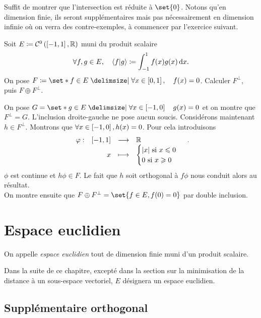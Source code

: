 \documentclass{magnolia}
\begin{document}
\begin{sol}
Suffit de montrer que l'intersection est réduite à $\set{0}$. Notons qu'en dimension finie, ils seront supplémentaires mais pas nécessairement en dimension infinie où on verra des contre-exemples, à commencer par l'exercice suivant.
\end{sol}

\begin{exoUnique}
\exo Soit $E\coloneqq\mathcal{C}^{0}\left(\left[-1,1\right],\mathbb{R}\right)$ muni du produit scalaire
  \[\forall f,g\in E ,\quad \left\langle {f}\middle|{g}\right\rangle\coloneqq\int_{-1}^{1} f(x)g(x)\,\text{d}x.\]
  On pose $F\defeq\enstq{f\in E}{\forall x\in\interf{0}{1} \qsep f(x)=0}$.
  Calculer $F^\perp$, puis $F\oplus F^\perp$.
  \begin{sol}
  On pose $G=\enstq{g\in E}{\forall x\in\interf{-1}{0} \quad g(x)=0}$ et on montre que $F^\perp=G$. L'inclusion droite-gauche ne pose aucun soucis. Considérons maintenant $h\in F^\perp$. Montrons que $\forall x \in \left[-1,0\right], h(x)=0$. Pour cela introduisons $$\begin{array}[t]{lrcl} \displaystyle{\varphi} : & \displaystyle{\left[-1,1\right]} & \longrightarrow & \displaystyle{\mathbb{R}} \\ & \displaystyle{x} & \longmapsto & \displaystyle{\begin{cases}|x| \text{ si } x\leqslant0\\0 \text{ si } x\geqslant0\end{cases}} \end{array}.$$ $\phi$ est continue et $h\phi \in F$. Le fait que $h$ soit orthogonal à $f\phi$ nous conduit alors au résultat.\\
  On montre ensuite que $F\oplus F^\perp=\set{f\in E, f(0)=0}$ par double inclusion.
  \end{sol}
\end{exoUnique}


\section{Espace euclidien}

\begin{definition}[utile=-3]
On appelle \emph{espace euclidien} tout \Rev de dimension finie muni d'un produit
scalaire.
\end{definition}

\begin{remarqueUnique}
\remarque Dans la suite de ce chapitre, excepté dans la section sur la minimisation de la distance à un
  sous-espace vectoriel, $E$ désignera un espace euclidien.  
\end{remarqueUnique}



\subsection{Supplémentaire orthogonal}
\end{document}
